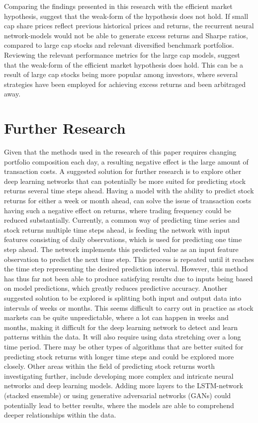 \indent\newline
Comparing the findings presented in this research with the efficient market hypothesis, suggest that the weak-form of the hypothesis does not hold. If small cap share prices reflect previous historical prices and returns, the recurrent neural network-models would not be able to generate excess returns and Sharpe ratios, compared to large cap stocks and relevant diversified benchmark portfolios. Reviewing the relevant performance metrics for the large cap models, suggest that the weak-form of the efficient market hypothesis does hold. This can be a result of large cap stocks being more popular among investors, where several strategies have been employed for achieving excess returns and been arbitraged away.     

\section{Further Research}
Given that the methods used in the research of this paper requires changing portfolio composition each day, a resulting negative effect is the large amount of transaction costs. A suggested solution for further research is to explore other deep learning networks that can potentially be more suited for predicting stock returns several time steps ahead. Having a model with the ability to predict stock returns for either a week or month ahead, can solve the issue of transaction costs having such a negative effect on returns, where trading frequency could be reduced substantially. Currently, a common way of predicting time series and stock returns multiple time steps ahead, is feeding the network with input features consisting of daily observations, which is used for predicting one time step ahead. The network implements this predicted value as an input feature observation to predict the next time step. This process is repeated until it reaches the time step representing the desired prediction interval. However, this method has thus far not been able to produce satisfying results due to inputs being based on model predictions, which greatly reduces predictive accuracy. Another suggested solution to be explored is splitting both input and output data into intervals of weeks or months. This seems difficult to carry out in practice as stock markets can be quite unpredictable, where a lot can happen in weeks and months, making it difficult for the deep learning network to detect and learn patterns within the data. It will also require using data stretching over a long time period. There may be other types of algorithms that are better suited for predicting stock returns with longer time steps and could be explored more closely. Other areas within the field of predicting stock returns worth investigating further, include developing more complex and intricate neural networks and deep learning models. Adding more layers to the LSTM-network (stacked ensemble) or using generative adversarial networks (GANs) could potentially lead to better results, where the models are able to comprehend deeper relationships within the data.  

